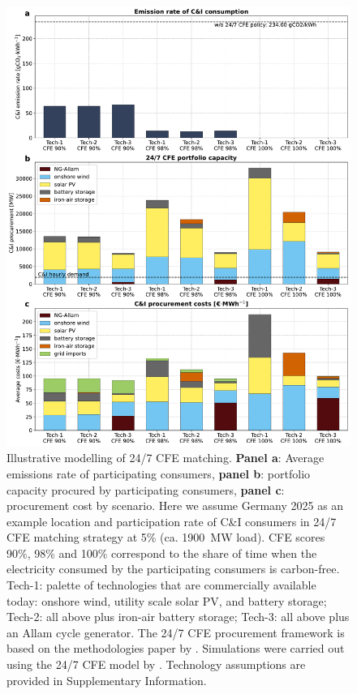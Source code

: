 \documentclass[pdflatex,sn-basic, Numbered]{sn-jnl}
\theoremstyle{thmstyleone}%
\theoremstyle{thmstyletwo}%
\theoremstyle{thmstylethree}%
\begin{document}
\begin{figure}[htbp]
    \centering
    \includegraphics[width=\textwidth]{images/dashboard_247CFE.pdf}
    \captionsetup{width=\textwidth}
    \caption{Illustrative modelling of 24/7 CFE matching.
    \textbf{Panel a}: Average emissions rate of participating consumers,
    \textbf{panel b}: portfolio capacity procured by participating consumers,
    \textbf{panel c}: procurement cost by scenario.
    Here we assume Germany 2025 as an example location and participation rate of C\&I consumers in 24/7 CFE matching strategy at 5\% (ca. 1900~MW load).
    CFE scores 90\%, 98\% and 100\% correspond to the share of time when the electricity consumed by the participating consumers is carbon-free.
    Tech-1: palette of technologies that are commercially available today: onshore wind, utility scale solar PV, and battery storage; Tech-2: all above plus iron-air battery storage; Tech-3: all above plus an Allam cycle generator. The 24/7 CFE procurement framework is based on the methodologies paper by \citet{google-methodologies}. Simulations were carried out using the 24/7 CFE model by \citet{riepinMeansCostsSystemlevel2024}. Technology assumptions are provided in Supplementary Information.\\
    }\label{fig:dashboard}
\end{figure}
\end{document}
